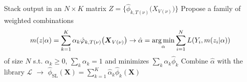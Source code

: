 \begin{frame}[fragile]%

{%
\setlength{\interspacetitleruled}{0pt}%
\setlength{\algotitleheightrule}{0pt}%
\begin{algorithm}[H]
Stack output in an $N\times K$ matrix
$Z=\bigl\{\hat{\phi}_{k,T(\nu)}\bigl(X_{V(\nu)}\bigr)\bigr\}$\;
Propose a family of weighted combinations\vspace{-1em}
\[
m(z\rvert\alpha)=\sum_{k=1}^K\alpha_k\hat{\phi}_{k,T(\nu)}\bigl(\boldsymbol{X}_{V(\nu)}\bigr)
\rightarrow
\hat{\alpha}=\argmin_\alpha\sum_{i=1}^NL(Y_i,m(z_i\rvert\alpha))
\vspace*{-1em}\]
of size $N$ s.t. $\alpha_k\geq0$, $\sum_k\alpha_k=1$ and minimizes $\sum_k\alpha_k\hat{\phi}_k$\;
Combine $\hat{\alpha}$ with the library $\hat{\mathcal{L}}$ $\rightarrow$ 
$\hat{\phi}_{\text{SL}}(\boldsymbol{X})=\sum_{k=1}^K\hat{\alpha}_k\hat{\phi}_k(\boldsymbol{X})$\;
\end{algorithm}}

\end{frame}
